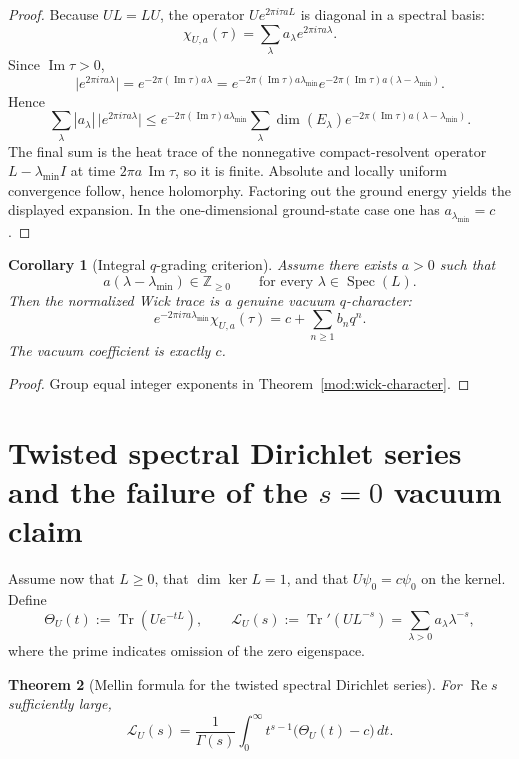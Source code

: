 \documentclass[11pt,a4paper]{article}
\numberwithin{equation}{section}
\newtheorem{theorem}{Theorem}[section]
\newtheorem{corollary}[theorem]{Corollary}
\theoremstyle{definition}
\theoremstyle{remark}
\DeclareMathOperator{\Rea}{Re}
\DeclareMathOperator{\Ima}{Im}
\newcommand{\ZZ}{\mathbb Z}
\begin{document}
\begin{proof}
Because $UL=LU$, the operator $Ue^{2\pi i\tau aL}$ is diagonal in a spectral basis:
\[
\chi_{U,a}(\tau)=\sum_\lambda a_\lambda e^{2\pi i\tau a\lambda}.
\]
Since $\Ima\tau>0$,
\[
\bigl|e^{2\pi i\tau a\lambda}\bigr|
=
e^{-2\pi (\Ima\tau)a\lambda}
=
e^{-2\pi (\Ima\tau)a\lambda_{\min}}
e^{-2\pi (\Ima\tau)a(\lambda-\lambda_{\min})}.
\]
Hence
\[
\sum_\lambda |a_\lambda|\,\bigl|e^{2\pi i\tau a\lambda}\bigr|
\le
e^{-2\pi (\Ima\tau)a\lambda_{\min}}
\sum_\lambda \dim(E_\lambda)e^{-2\pi (\Ima\tau)a(\lambda-\lambda_{\min})}.
\]
The final sum is the heat trace of the nonnegative compact-resolvent operator $L-\lambda_{\min}I$ at time $2\pi a\,\Ima\tau$, so it is finite.  Absolute and locally uniform convergence follow, hence holomorphy.  Factoring out the ground energy yields the displayed expansion.  In the one-dimensional ground-state case one has $a_{\lambda_{\min}}=c$.
\end{proof}

\begin{corollary}[Integral $q$-grading criterion]\label{mod:q-character}
Assume there exists $a>0$ such that
\[
a(\lambda-\lambda_{\min})\in\ZZ_{\ge 0}
\qquad
\text{for every }\lambda\in\operatorname{Spec}(L).
\]
Then the normalized Wick trace is a genuine vacuum $q$-character:
\[
e^{-2\pi i\tau a\lambda_{\min}}\chi_{U,a}(\tau)
=
c+\sum_{n\ge 1} b_n q^n.
\]
The vacuum coefficient is exactly $c$.
\end{corollary}

\begin{proof}
Group equal integer exponents in Theorem~\ref{mod:wick-character}.
\end{proof}

\section{Twisted spectral Dirichlet series and the failure of the $s=0$ vacuum claim}

Assume now that $L\ge 0$, that $\dim\ker L=1$, and that $U\psi_0=c\psi_0$ on the kernel.  Define
\[
\Theta_U(t):=\operatorname{Tr}(Ue^{-tL}),
\qquad
\mathcal L_U(s):=\operatorname{Tr}'(UL^{-s})
=
\sum_{\lambda>0} a_\lambda\lambda^{-s},
\]
where the prime indicates omission of the zero eigenspace.

\begin{theorem}[Mellin formula for the twisted spectral Dirichlet series]\label{mod:twisted-mellin}
For $\Rea s$ sufficiently large,
\[
\mathcal L_U(s)
=
\frac{1}{\Gamma(s)}
\int_0^\infty t^{s-1}\bigl(\Theta_U(t)-c\bigr)\,dt.
\]
\end{theorem}
\end{document}
